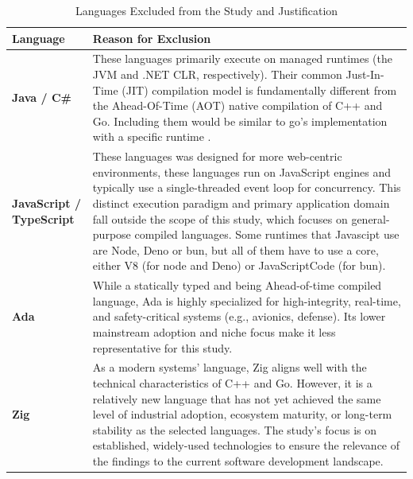 \begin{table}[!ht]
	\centering
	\caption{Languages Excluded from the Study and Justification}
	\label{tab:excluded_languages}
	\begin{tabularx}{\textwidth}{
		>{\raggedright\arraybackslash}p{}
		>{\raggedright\arraybackslash}X
	}
		\toprule
		\textbf{Language} & \textbf{Reason for Exclusion} \\
		\midrule
		
		\textbf{Java / C\#} &
		These languages primarily execute on managed runtimes (the JVM and .NET CLR, respectively). Their common Just-In-Time (JIT) compilation model is fundamentally different from the Ahead-Of-Time (AOT) native compilation of C++ and Go. Including them would be similar to go's implementation with a specific runtime . \\
		\addlinespace
		
		\textbf{JavaScript / TypeScript} &
		These languages was designed for more web-centric environments, these languages run on JavaScript engines and typically use a single-threaded event loop for concurrency. This distinct execution paradigm and primary application domain fall outside the scope of this study, which focuses on general-purpose compiled languages. Some runtimes that Javascipt use are Node, Deno or bun, but all of them have to use a core, either \gls{V8} (for node and Deno) or JavaScriptCode (for bun). \\
		\addlinespace
		
		\textbf{Ada} &
		While a statically typed and being Ahead-of-time compiled language, Ada is highly specialized for high-integrity, real-time, and safety-critical systems (e.g., avionics, defense). Its lower mainstream adoption and niche focus make it less representative for this study. \\
		\addlinespace
		
		\textbf{Zig} &
		As a modern systems' language, Zig aligns well with the technical characteristics of C++ and Go. However, it is a relatively new language that has not yet achieved the same level of industrial adoption, ecosystem maturity, or long-term stability as the selected languages. The study's focus is on established, widely-used technologies to ensure the relevance of the findings to the current software development landscape. \\
		\bottomrule
	\end{tabularx}
\end{table}



